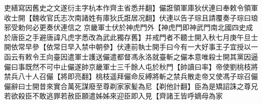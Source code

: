 吏繕寫因舊史之文遂衍主字杭本作齊主省悉并翻】儼誑領軍庫狄伏連曰奉敕令領軍收士開【魏收官氏志次南諸姓有庫狄氏誑居况翻】伏連以告子琮且請覆奏子琮曰琅邪受勅何必更奏伏連信之京畿軍士伏於神虎門外【神虎門即神武門南北國四史成於唐臣之手避唐諱凡虎字悉改為武此獨存舊】并戒門者不聽士開入秋七月庚午旦士開依常早參【依常日早入禁中朝參】伏連前執士開手曰今有一大好事王子宜授以一函云有敕令王向臺因遣軍士護送儼遣都督馮永洛就臺斬之儼本意唯殺士開其黨因逼儼曰事既然不可中止儼遂帥京畿軍士三千餘人屯於秋門【帥讀曰率】帝使劉桃枝將禁兵八十人召儼【將即亮翻】桃枝遥拜儼命反縛將斬之禁兵散走帝又使馮子琮召儼儼辭曰士開昔來實合萬死謀廢至尊剃家家髪為尼【剃他計翻】臣為是矯詔誅之尊兄若欲殺臣不敢逃罪若赦臣願遣姊姊來迎臣即入見【齊諸王皆呼嫡母為家